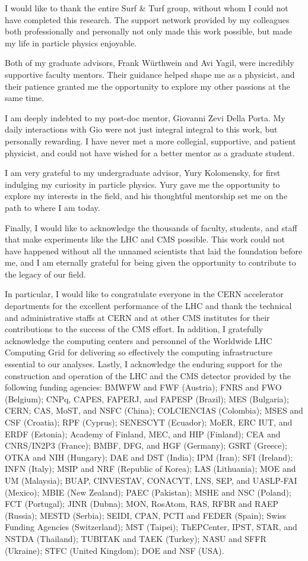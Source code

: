 \begin{frontmatter}
\begin{acknowledgements}
I would like to thank the entire Surf \& Turf group, without whom I could not have completed this research. The support network provided by my colleagues both professionally and personally not only made this work possible, but made my life in particle physics enjoyable.

Both of my graduate advisors, Frank W\"urthwein and Avi Yagil, were incredibly supportive faculty mentors. Their guidance helped shape me as a physicist, and their patience granted me the opportunity to explore my other passions at the same time.

I am deeply indebted to my post-doc mentor, Giovanni Zevi Della Porta. My daily interactions with Gio were not just integral integral to this work, but personally rewarding. I have never met a more collegial, supportive, and patient physicist, and could not have wished for a better mentor as a graduate student.

I am very grateful to my undergraduate advisor, Yury Kolomensky, for first indulging my curiosity in particle physics. Yury gave me the opportunity to explore my interests in the field, and his thoughtful mentorship set me on the path to where I am today.

Finally, I would like to acknowledge the thousands of faculty, students, and staff that make experiments like the LHC and CMS possible. This work could not have happened without all the unnamed scientists that laid the foundation before me, and I am eternally grateful for being given the opportunity to contribute to the legacy of our field. 

In particular, I would like to congratulate everyone in the CERN accelerator departments for the excellent performance of the LHC and thank the technical and administrative staffs at CERN and at other CMS institutes for their contributions to the success of the CMS effort. In addition, I gratefully acknowledge the computing centers and personnel of the Worldwide LHC Computing Grid for delivering so effectively the computing infrastructure essential to our analyses. Lastly, I acknowledge the enduring support for the construction and operation of the LHC and the CMS detector provided by the following funding agencies: BMWFW and FWF (Austria); FNRS and FWO (Belgium); CNPq, CAPES, FAPERJ, and FAPESP (Brazil); MES (Bulgaria); CERN; CAS, MoST, and NSFC (China); COLCIENCIAS (Colombia); MSES and CSF (Croatia); RPF (Cyprus); SENESCYT (Ecuador); MoER, ERC IUT, and ERDF (Estonia); Academy of Finland, MEC, and HIP (Finland); CEA and CNRS/IN2P3 (France); BMBF, DFG, and HGF (Germany); GSRT (Greece); OTKA and NIH (Hungary); DAE and DST (India); IPM (Iran); SFI (Ireland); INFN (Italy); MSIP and NRF (Republic of Korea); LAS (Lithuania); MOE and UM (Malaysia); BUAP, CINVESTAV, CONACYT, LNS, SEP, and UASLP-FAI (Mexico); MBIE (New Zealand); PAEC (Pakistan); MSHE and NSC (Poland); FCT (Portugal); JINR (Dubna); MON, RosAtom, RAS, RFBR and RAEP (Russia); MESTD (Serbia); SEIDI, CPAN, PCTI and FEDER (Spain); Swiss Funding Agencies (Switzerland); MST (Taipei); ThEPCenter, IPST, STAR, and NSTDA (Thailand); TUBITAK and TAEK (Turkey); NASU and SFFR (Ukraine); STFC (United Kingdom); DOE and NSF (USA).


\end{acknowledgements}
\end{frontmatter}
